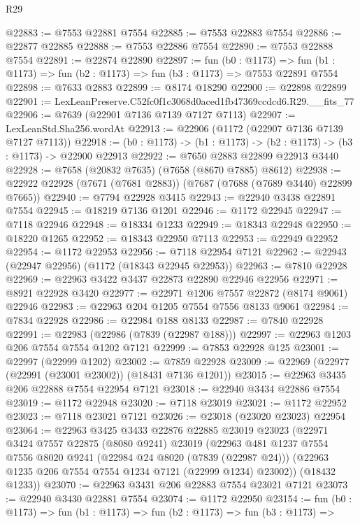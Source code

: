 \begin{lexlean}{R29}
\begin{coremodule}
@22883 := @7553 @22881 @7554
@22885 := @7553 @22883 @7554
@22886 := @22877 @22885
@22888 := @7553 @22886 @7554
@22890 := @7553 @22888 @7554
@22891 := @22874 @22890
@22897 := fun (b0 : @1173) =>
  fun (b1 : @1173) => fun (b2 : @1173) => fun (b3 : @1173) => @7553 @22891 @7554
@22898 := @7633 @2883
@22899 := @8174 @18290
@22900 := @22898 @22899
@22901 := LexLeanPreserve.C52fc0f1c3068d0aced1fb47369ccdcd6.R29.__fits_77
@22906 := @7639 (@22901 @7136 @7139 @7127 @7113)
@22907 := LexLeanStd.Sha256.wordAt
@22913 := @22906 (@1172 (@22907 @7136 @7139 @7127 @7113))
@22918 := (b0 : @1173) -> (b1 : @1173) -> (b2 : @1173) -> (b3 : @1173) -> @22900 @22913
@22922 := @7650 @2883 @22899 @22913 @3440
@22928 := @7658 (@20832 @7635) (@7658 (@8670 @7885) @8612)
@22938 := @22922 @22928 (@7671 (@7681 @2883)) (@7687 (@7688 (@7689 @3440) @22899 @7665))
@22940 := @7794 @22928 @3415
@22943 := @22940 @3438 @22891 @7554
@22945 := @18219 @7136 @1201
@22946 := @1172 @22945
@22947 := @7118 @22946
@22948 := @18334 @1233
@22949 := @18343 @22948
@22950 := @18220 @1265
@22952 := @18343 @22950 @7113
@22953 := @22949 @22952
@22954 := @1172 @22953
@22956 := @7118 @22954 @7121
@22962 := @22943 (@22947 @22956) (@1172 (@18343 @22945 @22953))
@22963 := @7810 @22928
@22969 := @22963 @3422 @3437 @22873 @22890 @22946 @22956
@22971 := @8921 @22928 @3420
@22977 := @22971 @1206 @7557 @22872 (@8174 @9061) @22946
@22983 := @22963 @204 @1205 @7554 @7556 @8133 @9061
@22984 := @7834 @22928
@22986 := @22984 @188 @8133
@22987 := @7840 @22928
@22991 := @22983 (@22986 (@7839 (@22987 @188)))
@22997 := @22963 @1203 @206 @7554 @7554 @1202 @7121
@22999 := @7853 @22928 @125
@23001 := @22997 (@22999 @1202)
@23002 := @7859 @22928
@23009 := @22969 (@22977 (@22991 (@23001 @23002)) (@18431 @7136 @1201))
@23015 := @22963 @3435 @206 @22888 @7554 @22954 @7121
@23018 := @22940 @3434 @22886 @7554
@23019 := @1172 @22948
@23020 := @7118 @23019
@23021 := @1172 @22952
@23023 := @7118 @23021 @7121
@23026 := @23018 (@23020 @23023) @22954
@23064 := @22963
    @3425
    @3433
    @22876
    @22885
    @23019
    @23023
    (@22971
      @3424
      @7557
      @22875
      (@8080 @9241)
      @23019
      (@22963
        @481
        @1237
        @7554
        @7556
        @8020
        @9241
        (@22984 @24 @8020 (@7839 (@22987 @24)))
        (@22963 @1235 @206 @7554 @7554 @1234 @7121 (@22999 @1234) @23002))
      (@18432 @1233))
@23070 := @22963 @3431 @206 @22883 @7554 @23021 @7121
@23073 := @22940 @3430 @22881 @7554
@23074 := @1172 @22950
@23154 := fun (b0 : @1173) =>
  fun (b1 : @1173) =>
  fun (b2 : @1173) =>
  fun (b3 : @1173) =>

\end{coremodule}
\end{lexlean}
